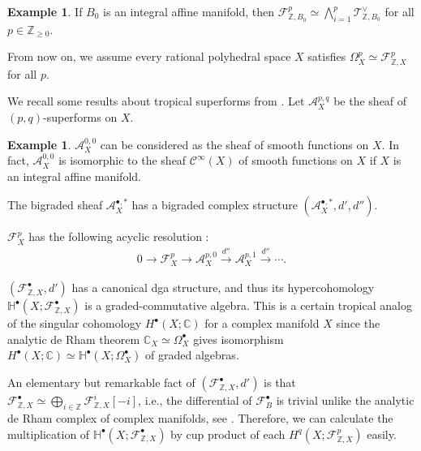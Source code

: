 \documentclass[a4paper,dvipdfmx,reqno,12pt]{amsart}
\theoremstyle{definition}
\newtheorem{example}[theorem]{Example}
\newcommand{\C}{\mathbb{C}}%
\newcommand{\Z}{\mathbb{Z}}%
\newcommand{\mb}[1]{\mathbb{#1}}%
\newcommand{\mcal}[1]{\mathcal{#1}}%
\newcommand{\xto}[1]{\xrightarrow{#1}}
\numberwithin{equation}{section}
\begin{document}
\begin{example}
If $B_0$ is an integral affine manifold, then 
$\mathcal{F}^{p}_{\mathbb{Z},B_0}\simeq 
\bigwedge^{p}_{i=1} \mathcal{T}_{\mathbb{Z},B_0}^{\vee}$ for 
all $p\in \mathbb{Z}_{\geq 0}$.
\end{example}

From now on, we assume every rational polyhedral space $X$
satisfies $\Omega_X^{p}\simeq \mathcal{F}_{\mathbb{Z},X}^{p}$
for all $p$. 

We recall some results about tropical superforms from
\cite{MR3903579,smacka2017differential}.
Let $\mathcal{A}^{p,q}_X$ be the sheaf of 
$(p,q)$-superforms on $X$. 
\begin{example}
$\mathcal{A}_X^{0,0}$ can be considered as the 
sheaf of smooth functions on $X$.
In fact, $\mathcal{A}_X^{0,0}$ is isomorphic to 
the sheaf $\mathcal{C}^{\infty}(X)$ of smooth functions 
on $X$ if $X$ is an integral affine manifold.
\end{example}
The bigraded sheaf $\mathcal{A}_X^{\bullet,*}$ has a bigraded
complex structure
$(\mathcal{A}_X^{\bullet,*},d',d'')$.

$\mcal{F}^{p}_{X}$ has the following acyclic resolution
\cite[Corollary 3.18, Lemma 3.21]{MR3903579}:
\begin{align}
  0 \to \mcal{F}^{p}_{X} \to \mcal{A}^{p,0}_{X}\xto{d''} 
\mcal{A}^{p,1}_{X} \xto{d''}\cdots.
\end{align}

$(\mathcal{F}_{\mathbb{Z},X}^{\bullet},d')$ has a canonical dga structure, 
and thus its hypercohomology 
$\mb{H}^{\bullet}(X;\mcal{F}_{\mathbb{Z},X}^{\bullet})$ is a 
graded-commutative algebra. 
This is a certain tropical analog of the singular cohomology
$H^{\bullet}(X;\C)$ for a complex manifold $X$ since 
the analytic de Rham theorem $\C_X \simeq \Omega_X^{\bullet}$ 
gives isomorphism 
$H^{\bullet}(X;\C)\simeq \mb{H}^{\bullet}(X;\Omega_X^{\bullet})$
of graded algebras. 

An elementary but remarkable fact of 
$(\mcal{F}_{\mathbb{Z},X}^{\bullet},d')$ is that 
$\mcal{F}_{\mathbb{Z},X}^{\bullet}\simeq 
\bigoplus_{i\in \Z}\mcal{F}_{\mathbb{Z},X}^{i}[-i]$, i.e., the differential 
of $\mcal{F}_{B}^{\bullet}$ is trivial unlike the analytic de Rham complex
of complex manifolds, see \cite[Corollary 2.15]{smacka2017differential}.
Therefore, we can calculate the multiplication of 
$\mb{H}^{\bullet}(X;\mcal{F}_{\mathbb{Z},X}^{\bullet})$ by 
cup product of each $H^{q}(X;\mcal{F}_{\mathbb{Z},X}^{p})$ easily.
\end{document}
